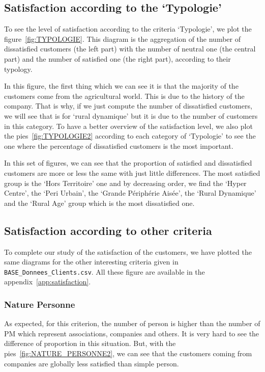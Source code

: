 \documentclass[a4paper, 11pt]{article}
\newcommand{\tw}[1]{\texttt{#1}}
\begin{document}
    \subsection{Satisfaction according to the `Typologie'}
    To see the level of satisfaction according to the criteria `Typologie', we plot the figure~\ref{fig:TYPOLOGIE}. This diagram is the aggregation of the number of dissatisfied customers (the left part) with the number of neutral one (the central part) and the number of satisfied one (the right part), according to their typology. 
    
    In this figure, the first thing which we can see it is that the majority of the customers come from the agricultural world. This is due to the history of the company. That is why, if we just compute the number of dissatisfied customers, we will see that is for `rural dynamique' but it is due to the number of customers in this category. To have a better overview of the satisfaction level, we also plot the pies~\ref{fig:TYPOLOGIE2} according to each category of `Typologie' to see the one where the percentage of dissatisfied customers is the most important. 
    
    In this set of figures, we can see that the proportion of satisfied and dissatisfied customers are more or less the same with just little differences. The most satisfied group is the `Hors Territoire' one and by decreasing order, we find the `Hyper Centre', the `Peri Urbain', the `Grande Périphérie Aisée', the `Rural Dynamique' and the `Rural Age' group which is the most dissatisfied one.
    
    \subsection{Satisfaction according to other criteria}
    To complete our study of the satisfaction of the customers, we have plotted the same diagrams for the other interesting criteria given in \tw{BASE\_Donnees\_Clients.csv}. All these figure are available in the appendix~\ref{app:satisfaction}.
    
    \subsubsection{Nature Personne}
    As expected, for this criterion, the number of person is higher than the number of PM which represent associations, companies and others. It is very hard to see the difference of proportion in this situation. But, with the pies~\ref{fig:NATURE_PERSONNE2}, we can see that the customers coming from companies are globally less satisfied than simple person.
    
\end{document}

